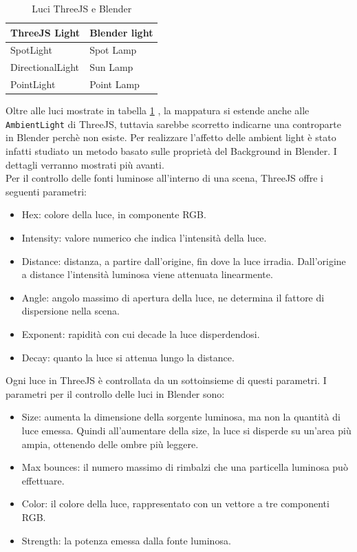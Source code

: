 \begin{table}[]
\centering
\caption{Luci ThreeJS e Blender}
\label{light_table}
\begin{tabular}{|l|l|}
\hline
\textbf{ThreeJS Light} & \textbf{Blender light} \\ \hline
SpotLight & Spot Lamp \\ \hline
DirectionalLight & Sun Lamp \\ \hline
PointLight & Point Lamp \\ \hline
\end{tabular}
\end{table}
Oltre alle luci mostrate in tabella \ref{light_table} , la mappatura si estende anche alle \texttt{AmbientLight} di ThreeJS, tuttavia sarebbe scorretto indicarne una controparte in Blender perchè non esiste. Per realizzare l’affetto delle ambient light è stato infatti studiato un metodo basato sulle proprietà del Background in Blender. I dettagli verranno mostrati più avanti.
\\
Per il controllo delle fonti luminose all’interno di una scena, ThreeJS offre i seguenti parametri:
\begin{itemize}
\item Hex: colore della luce, in componente RGB.
\item Intensity: valore numerico che indica l’intensità della luce.
\item Distance: distanza, a partire dall’origine, fin dove la luce irradia. Dall’origine a distance l’intensità luminosa viene attenuata linearmente.
\item Angle: angolo massimo di apertura della luce, ne determina il fattore di dispersione nella scena.
\item Exponent: rapidità con cui decade la luce disperdendosi.
\item Decay: quanto la luce si attenua lungo la distance.
\end{itemize}
Ogni luce in ThreeJS è controllata da un sottoinsieme di questi parametri. 
I parametri per il controllo delle luci in Blender sono:
\begin{itemize}
\item Size: aumenta la dimensione della sorgente luminosa, ma non la quantità di luce emessa. Quindi all’aumentare della size, la luce si disperde su un’area più ampia, ottenendo delle ombre più leggere.
\item Max bounces: il numero massimo di rimbalzi che una particella luminosa può effettuare.
\item Color: il colore della luce, rappresentato con un vettore a tre componenti RGB.
\item Strength: la potenza emessa dalla fonte luminosa.
\end{itemize}
